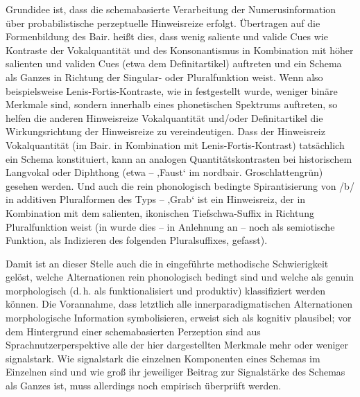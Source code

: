  Grundidee ist,\largerpage{} dass die schemabasierte Verarbeitung der Numerusinformation über probabilistische perzeptuelle Hinweisreize erfolgt. Übertragen auf die Formenbildung des Bair. heißt dies, dass wenig saliente und valide Cues wie Kontraste der Vokalquantität und des Konsonantismus in Kombination mit höher salienten und validen Cues (etwa dem Definitartikel) auftreten und ein Schema als Ganzes in Richtung der Singular- oder Pluralfunktion weist. Wenn also beispielsweise Lenis-Fortis-Kontraste, wie in  festgestellt wurde, weniger binäre Merkmale sind, sondern innerhalb eines phonetischen Spektrums auftreten, so helfen die anderen Hinweisreize Vokalquantität und/oder Definitartikel die Wirkungsrichtung der Hinweisreize zu vereindeutigen. Dass der Hinweisreiz Vokalquantität (im Bair. in Kombination mit Lenis-Fortis-Kontrast) tatsächlich ein Schema konstituiert, kann an analogen Quantitätskontrasten bei historischem Langvokal oder Diphthong (etwa  --  ‚Faust‘ im nordbair. Groschlattengrün) gesehen werden. Und auch die rein phonologisch bedingte Spirantisierung von /b/ in additiven Pluralformen des Typs  --  ‚Grab‘ ist ein Hinweisreiz, der in Kombination mit dem salienten, ikonischen Tiefschwa-Suffix in Richtung Pluralfunktion weist (in  wurde dies -- in Anlehnung an \citealt{Ronneberger-Sibold1990} -- noch als semiotische Funktion, als Indizieren des folgenden Pluralsuffixes, gefasst).

\begin{sloppypar}
Damit ist an dieser Stelle auch die in  eingeführte methodische Schwierigkeit gelöst, welche Alternationen rein phonologisch bedingt sind und welche als genuin morphologisch (d.\,h. als funktionalisiert und produktiv) klassifiziert werden können. Die Vorannahme, dass letztlich alle innerparadigmatischen Alternationen morphologische Information symbolisieren, erweist sich als kognitiv plausibel; vor dem Hintergrund einer schemabasierten Perzeption sind aus Sprachnutzerperspektive alle der hier dargestellten Merkmale mehr oder weniger signalstark. Wie signalstark die einzelnen Komponenten eines Schemas im Einzelnen sind und wie groß ihr jeweiliger Beitrag zur Signalstärke des Schemas als Ganzes ist, muss allerdings noch empirisch überprüft werden.
\end{sloppypar}

